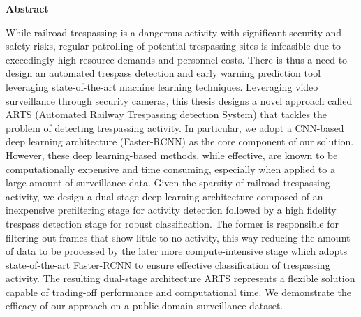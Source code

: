 
\begin{center} 
\textbf{Abstract}
\end{center}
While railroad trespassing is a dangerous activity with significant security and safety risks, regular patrolling of potential trespassing sites is infeasible due to exceedingly high resource demands and personnel costs. There is thus a need to design an automated trespass detection and early warning prediction tool leveraging state-of-the-art machine learning techniques.  Leveraging video surveillance through security cameras, this thesis designs a novel approach called ARTS (Automated Railway Trespassing detection System) that tackles the problem of detecting trespassing activity.  In particular, we adopt a CNN-based deep learning architecture (Faster-RCNN) as the core component of our solution. However, these deep learning-based methods, while effective, are known to be computationally expensive and time consuming, especially when applied to a large amount of surveillance data. Given the sparsity of railroad trespassing activity, we design a dual-stage deep learning architecture composed of an inexpensive prefiltering stage for activity detection followed by a high fidelity trespass detection stage for robust classification.  The former is responsible for filtering out frames that show little to no activity, this way reducing the amount of data to be processed by the later more compute-intensive stage which adopts state-of-the-art Faster-RCNN to ensure effective classification of trespassing activity.  The resulting dual-stage architecture ARTS represents a flexible solution capable of trading-off performance and computational time. We demonstrate the efficacy of our approach on a public domain surveillance dataset.
\newpage